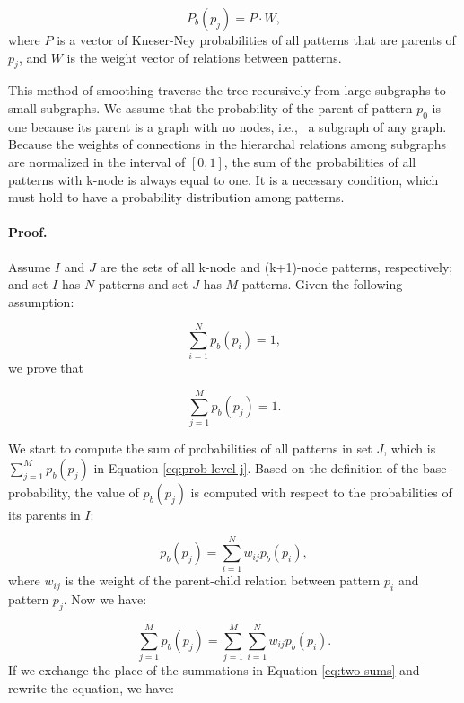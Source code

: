 \begin{equation}
P_b(p_j)  = P \cdot W,
\end{equation}
%
where $P$ is a vector of \mbox{Kneser-Ney} probabilities of all patterns that are parents of $p_j$, and $W$ is the weight vector of relations between patterns.  

This method of smoothing traverse the tree recursively from large subgraphs to small subgraphs. 
We assume that the probability of the parent of pattern $p_0$ is one because its parent is a graph with no nodes, i.e., \ a subgraph of any graph.
Because the weights of connections in the hierarchal relations among subgraphs are normalized in the interval of $[0,1]$, the
sum of the probabilities of all patterns with k-node is always
equal to one. 
It is a necessary condition, which must hold to have a probability distribution among patterns.  

\paragraph{Proof.} 
Assume $I$ and $J$ are the sets of all k-node and (k+1)-node
patterns, respectively; and set $I$ has $N$ patterns and set $J$ has $M$ patterns. 
Given the following assumption: 

\begin{equation}
\sum_{i=1}^N p_b(p_i)=1,
\end{equation}
%
we prove that  

\begin{equation}
  \label{eq:prob-level-j}
  \sum_{j=1}^M p_b(p_j)=1. 
\end{equation}

We start to compute the sum of probabilities of all patterns in set $J$, which is $\sum_{j=1}^M p_b(p_j)$ in Equation \ref{eq:prob-level-j}.
Based on the definition of the base probability, the value of
$p_b(p_j)$ is computed with respect to the probabilities of its parents in $I$:

\begin{equation}
  p_b(p_j)=\sum_{i=1}^N w_{ij}p_b(p_i),
\end{equation}
where $w_{ij}$ is the weight of the \mbox{parent-child} relation between pattern $p_i$ and pattern $p_j$. 
Now we have:

\begin{equation}
\label{eq:two-sums}
\sum_{j=1}^M p_b(p_j) = \sum_{j=1}^M\sum_{i=1}^N w_{ij}p_b(p_i).
\end{equation}
%
If we exchange the place of the summations in Equation \ref{eq:two-sums} and rewrite the equation, we have: 

